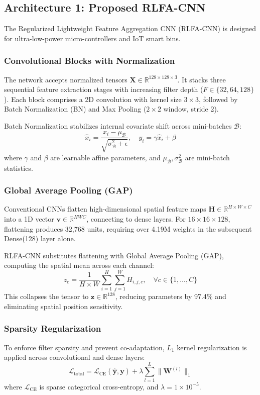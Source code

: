 \documentclass[conference]{IEEEtran}
\begin{document}
\subsection{Architecture 1: Proposed RLFA-CNN}
The Regularized Lightweight Feature Aggregation CNN (RLFA-CNN) is designed for ultra-low-power micro-controllers and IoT smart bins. 

\subsubsection{Convolutional Blocks with Normalization}
The network accepts normalized tensors $\mathbf{X} \in \mathbb{R}^{128 \times 128 \times 3}$. It stacks three sequential feature extraction stages with increasing filter depth ($F \in \{32, 64, 128\}$). Each block comprises a 2D convolution with kernel size $3 \times 3$, followed by Batch Normalization (BN) and Max Pooling ($2 \times 2$ window, stride 2).

Batch Normalization stabilizes internal covariate shift across mini-batches $\mathcal{B}$:
\begin{equation}
\hat{x}_i = \frac{x_i - \mu_\mathcal{B}}{\sqrt{\sigma_\mathcal{B}^2 + \epsilon}}, \quad y_i = \gamma \hat{x}_i + \beta
\end{equation}
where $\gamma$ and $\beta$ are learnable affine parameters, and $\mu_\mathcal{B}, \sigma_\mathcal{B}^2$ are mini-batch statistics.

\subsubsection{Global Average Pooling (GAP)}
Conventional CNNs flatten high-dimensional spatial feature maps $\mathbf{H} \in \mathbb{R}^{H \times W \times C}$ into a 1D vector $\mathbf{v} \in \mathbb{R}^{HWC}$, connecting to dense layers. For $16 \times 16 \times 128$, flattening produces 32,768 units, requiring over 4.19M weights in the subsequent Dense(128) layer alone.

RLFA-CNN substitutes flattening with Global Average Pooling (GAP), computing the spatial mean across each channel:
\begin{equation}
z_c = \frac{1}{H \times W} \sum_{i=1}^H \sum_{j=1}^W H_{i,j,c}, \quad \forall c \in \{1, \dots, C\}
\end{equation}
This collapses the tensor to $\mathbf{z} \in \mathbb{R}^{128}$, reducing parameters by 97.4\% and eliminating spatial position sensitivity.

\subsubsection{Sparsity Regularization}
To enforce filter sparsity and prevent co-adaptation, $L_1$ kernel regularization is applied across convolutional and dense layers:
\begin{equation}
\mathcal{L}_{\text{total}} = \mathcal{L}_{\text{CE}}(\hat{\mathbf{y}}, \mathbf{y}) + \lambda \sum_{l=1}^L \|\mathbf{W}^{(l)}\|_1
\end{equation}
where $\mathcal{L}_{\text{CE}}$ is sparse categorical cross-entropy, and $\lambda = 1 \times 10^{-5}$.
\end{document}
